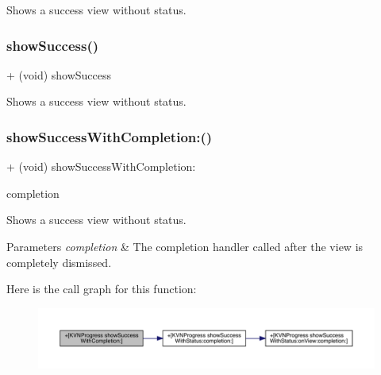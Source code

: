 Shows a success view without status. \mbox{\label{interface_k_v_n_progress_a3b92c0b7eeebe3537ba37d7f56c5b2bb}} 
\subsubsection{\texorpdfstring{show\+Success()}{showSuccess()}\hspace{0.1cm}{\footnotesize\ttfamily [3/3]}}
{\footnotesize\ttfamily + (void) show\+Success \begin{DoxyParamCaption}{ }\end{DoxyParamCaption}}

Shows a success view without status. \mbox{\label{interface_k_v_n_progress_aa5757d5457364be1b1a03224c934ff32}} 
\subsubsection{\texorpdfstring{show\+Success\+With\+Completion\+:()}{showSuccessWithCompletion:()}\hspace{0.1cm}{\footnotesize\ttfamily [1/3]}}
{\footnotesize\ttfamily + (void) show\+Success\+With\+Completion\+: \begin{DoxyParamCaption}\item[{(K\+V\+N\+Completion\+Block)}]{completion }\end{DoxyParamCaption}}

Shows a success view without status. 
\begin{DoxyParams}{Parameters}
{\em completion} & The completion handler called after the view is completely dismissed. \\
\hline
\end{DoxyParams}
Here is the call graph for this function\+:\nopagebreak
\begin{figure}[H]
\begin{center}
\leavevmode
\includegraphics[width=350pt]{interface_k_v_n_progress_aa5757d5457364be1b1a03224c934ff32_cgraph}
\end{center}
\end{figure}
\mbox{\label{interface_k_v_n_progress_aa5757d5457364be1b1a03224c934ff32}} 
